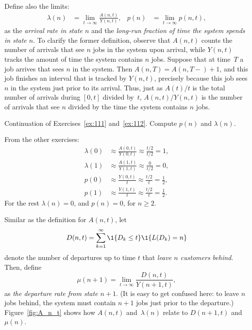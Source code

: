 Define also the limits:
\begin{align}\label{eq:p(n)}
  \lambda(n) &= \lim_{t\to\infty} \frac{A(n,t)}{Y(n,t)}, &p(n) &=\lim_{t\to\infty} p(n,t),
\end{align}
as the \emph{arrival rate in state $n$} and the \emph{long-run fraction of
  time the system spends in state $n$}. To clarify the former
definition, observe that $A(n,t)$ counts the number of arrivals that
see $n$ jobs in the system upon arrival, while $Y(n,t)$ tracks the amount of time
the system contains $n$ jobs. Suppose that at time~$T$ a job arrives that
sees $n$ in the system. Then $A(n,T)=A(n, T-)+1$, and this job finishes
an interval that is tracked by $Y(n,t)$, precisely because this job
sees $n$ in the system just prior to its arrival. Thus, just as
$A(t)/t$ is the total number of arrivals during $[0,t]$ divided by~$t$, $A(n,t)/Y(n,t)$ is the number of arrivals that see $n$ divided by
the time the system contains $n$ jobs.

\begin{exercise}\label{ex:113} Continuation of Exercises~\ref{ex:111} and~\ref{ex:112}.  Compute $p(n)$  and $\lambda(n)$. 
  \begin{solution}
    From the other exercises:
    \begin{align*}
      \lambda(0) &\approx \frac{A(0,t)}{Y(0,t)} \approx \frac{t/2}{t/2} = 1, \\
      \lambda(1) &\approx \frac{A(1,t)}{Y(1,t)} \approx \frac{0}{t/2} = 0, \\
      p(0) &\approx \frac{Y(0,t)}{t} \approx \frac{t/2}{t} = \frac 1 2, \\
      p(1) &\approx \frac{Y(1,t)}{t} \approx \frac{t/2}{t} = \frac 1 2.
    \end{align*}
For the rest $\lambda(n) = 0$, and $p(n)=0$, for $n\geq 2$.
  \end{solution}
\end{exercise}

Similar as the definition for $A(n,t)$, let
\begin{equation*}
    D(n,t) = \sum_{k=1}^\infty \1{D_k \leq t} \1{L(D_k) = n}
  \end{equation*}
  denote the number of departures up to time $t$ that\emph{ leave $n$
    customers behind}. Then,  define
\begin{equation*}
  \mu(n+1) = \lim_{t\to\infty} \frac{D(n,t)}{Y(n+1,t)},
\end{equation*}
as \emph{ the departure rate from state $n+1$}. (It is easy to get
confused here: to leave $n$ jobs behind, the system must contain $n+1$
jobs just prior to the departure.) Figure~\ref{fig:A_n_t} shows how
$A(n,t)$ and~$\lambda(n)$ relate to $D(n+1,t)$ and $\mu(n)$.

